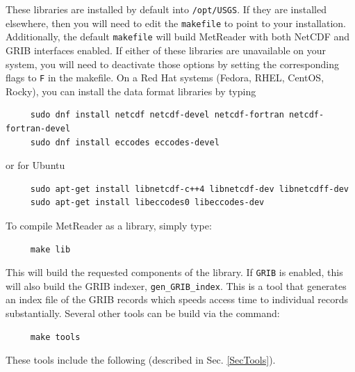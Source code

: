 \documentclass[11pt]{article}   %
\begin{document}
These libraries are installed by default into \texttt{/opt/USGS}.  If they are
installed elsewhere, then you will need to edit the \texttt{makefile}
to point to your installation.
Additionally, the default \texttt{makefile} will build MetReader with both NetCDF and GRIB
interfaces enabled.  If either of these libraries are unavailable on your system, you will need to
deactivate those options by setting the corresponding flags to \texttt{F} in the makefile.
On a Red Hat systems (Fedora, RHEL, CentOS, Rocky), you can install the data
format libraries by typing
\begin{verbatim}
     sudo dnf install netcdf netcdf-devel netcdf-fortran netcdf-fortran-devel
     sudo dnf install eccodes eccodes-devel
\end{verbatim}
or for Ubuntu
\begin{verbatim}
     sudo apt-get install libnetcdf-c++4 libnetcdf-dev libnetcdff-dev
     sudo apt-get install libeccodes0 libeccodes-dev
\end{verbatim}
To compile MetReader as a library, simply type:
\begin{verbatim}
     make lib
\end{verbatim}
This will build the requested components of the library.  If \texttt{GRIB} is enabled,
this will also build the GRIB indexer, \texttt{gen\_GRIB\_index}.
This is a tool that generates an index file of the GRIB records which speeds
access time to individual records substantially.
Several other tools can be build via the command:
\begin{verbatim}
     make tools
\end{verbatim}
These tools include the following (described in Sec. \ref{SecTools}).
\end{document}
